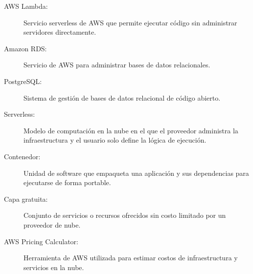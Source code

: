 \begin{description}
    \item[AWS Lambda:] Servicio serverless de AWS que permite ejecutar código sin administrar servidores directamente.
    \item[Amazon RDS:] Servicio de AWS para administrar bases de datos relacionales.
    \item[PostgreSQL:] Sistema de gestión de bases de datos relacional de código abierto.
    \item[Serverless:] Modelo de computación en la nube en el que el proveedor administra la infraestructura y el usuario solo define la lógica de ejecución.
    \item[Contenedor:] Unidad de software que empaqueta una aplicación y sus dependencias para ejecutarse de forma portable.
    \item[Capa gratuita:] Conjunto de servicios o recursos ofrecidos sin costo limitado por un proveedor de nube.
    \item[AWS Pricing Calculator:] Herramienta de AWS utilizada para estimar costos de infraestructura y servicios en la nube.
\end{description}
